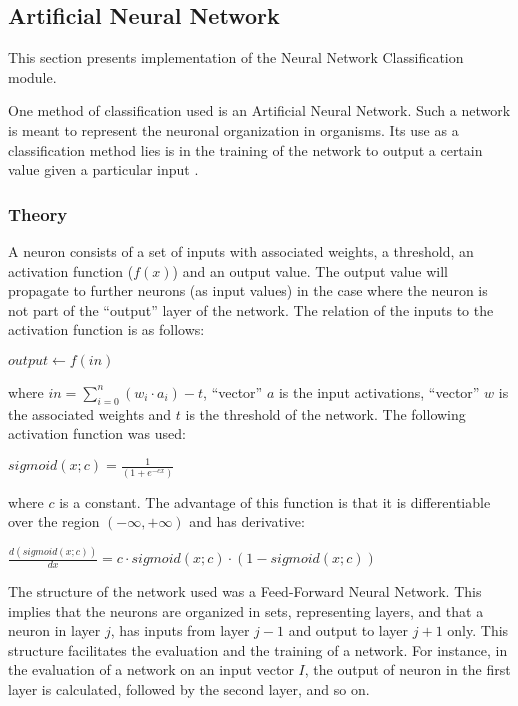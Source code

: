 \subsection{Artificial Neural Network}
\label{sect:nnet}


This section presents implementation of the Neural Network Classification module.

One method of classification used is an Artificial Neural
Network. Such a network is meant to represent the neuronal
organization in organisms. Its use as a classification method lies is
in the training of the network to output a certain value given a
particular input \cite{artificialintelligence}.

\subsubsection{Theory}

A neuron consists of a set of inputs with associated weights, a
threshold, an activation function ($f(x)$) and an output value. The
output value will propagate to further neurons (as input values) in
the case where the neuron is not part of the ``output'' layer of the
network. The relation of the inputs to the activation function is as
follows:

$output \longleftarrow f(in)$

where $in = \displaystyle\sum_{i=0}^{n}(w_{i} \cdot a_{i}) - t$, ``vector'' $a$ is the
input activations, ``vector'' $w$ is the associated weights and $t$ is the
threshold of the network. The following activation function was used:

$sigmoid(x; c) = \frac{1}{(1 + e^{-cx})}$

where $c$ is a constant. The advantage of this function is that it is
differentiable over the region $(-\infty,+\infty)$ and has derivative:

$\frac{d(sigmoid(x; c))}{dx} = c \cdot sigmoid(x; c) \cdot (1 - sigmoid(x; c))$

The structure of the network used was a Feed-Forward Neural
Network. This implies that the neurons are organized in sets,
representing layers, and that a neuron in layer $j$, has inputs from
layer $j-1$ and output to layer $j+1$ only. This structure facilitates the
evaluation and the training of a network. For instance, in the
evaluation of a network on an input vector $I$, the output of neuron in
the first layer is calculated, followed by the second layer, and so
on.

